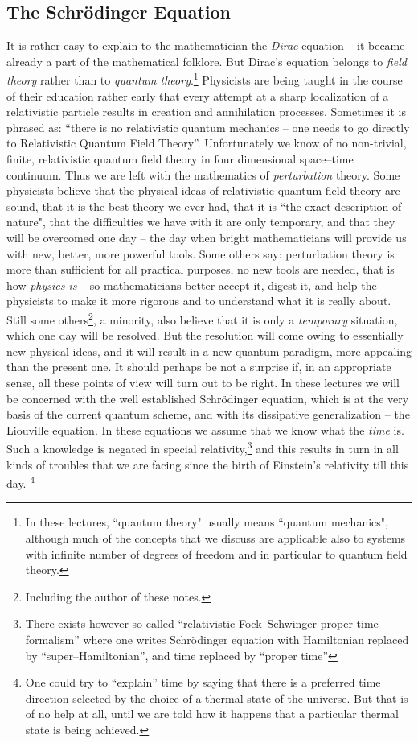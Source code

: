 \documentclass[12pt]{article}
\begin{document}
\subsection{The Schr\"odinger Equation}

It is rather easy to explain to the mathematician the {\em Dirac} equation --
it became already a part of the mathematical folklore.  But Dirac's equation
belongs to {\em field theory} rather than to
{\em quantum theory}.\footnote{In
these lectures, ``quantum theory" usually means
``quantum mechanics",  although much of the concepts that we discuss
are applicable also to systems with infinite number of degrees of
freedom and in particular to quantum field theory. } Physicists are being
taught in the course of their education rather early that every attempt at a
sharp localization of a relativistic particle results in creation and
annihilation processes.  Sometimes it is phrased as:  ``there is no relativistic
quantum mechanics -- one needs to go directly to Relativistic Quantum Field
Theory''.  Unfortunately we know of no non-trivial,  finite,  
relativistic quantum
field theory in four dimensional space--time continuum.  Thus we are left
with the mathematics of {\em perturbation} theory.  Some physicists believe
that the physical ideas of relativistic quantum field theory are sound,  that
it is the best theory we ever had,  that it is ``the exact description of 
nature",  that
the difficulties we have with it are only temporary,  and that they will be 
overcomed one day --
the day when bright mathematicians will provide us with new,  better,  more
powerful tools.  Some others say:  perturbation theory is more than sufficient
for all practical purposes,  no new tools are needed,  that is how {\em physics
is} -- so mathematicians better accept it,  digest it,  and help the physicists
to make it more rigorous and to understand what it is really about.  Still some
others\footnote{Including the  author of these notes. },  a
minority,  also believe that it is only a {\em temporary} situation,  which
one day will be resolved.  But the resolution will come
owing to essentially
{new physical ideas}, 
and it will result in a new quantum paradigm,  more appealing than the
present one.  It should perhaps be not a surprise if, in an appropriate sense,  
all
these points of view will turn out to be right.  In these lectures we will be
concerned with the well established Schr\"odinger equation,  which is at the
very basis of the current quantum scheme,  and with its dissipative
generalization -- the Liouville equation. 
In these equations we assume that we 
know what the {\em time} is.  Such a knowledge is negated in special
relativity,\footnote{There exists however so called ``relativistic
Fock--Schwinger proper time formalism'' \cite[Ch. 2--5--4]{itz} where
one writes Schr\"odinger equation with Hamiltonian replaced by
``super--Hamiltonian'',  and time replaced by ``proper time''} and this results
in turn in all kinds of troubles that we are facing since the birth of
Einstein's relativity till this day.%
\footnote{One could try to ``explain'' time by saying that there is a
preferred time direction selected by
the choice of a thermal state of the universe. But that is of no help
at all, until
we are told how it happens that a particular thermal state is
being achieved.}
\end{document}
